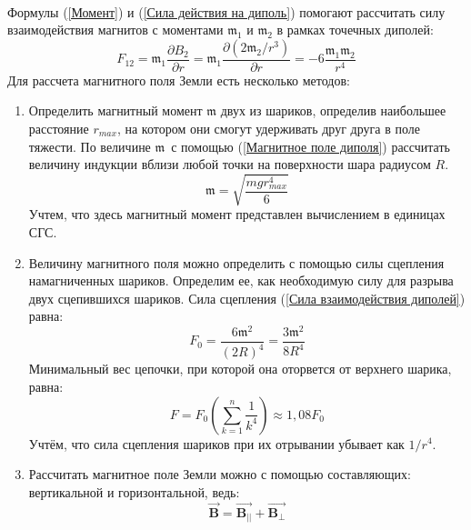 \documentclass[a4paper, 12pt]{article}
\begin{document}
\paragraph{}
Формулы (\ref{Момент}) и (\ref{Сила действия на диполь}) помогают рассчитать силу взаимодействия магнитов с моментами $\mathfrak{m_{1}}$ и $\mathfrak{m_{2}}$ в рамках точечных диполей:
\begin{equation}
    F_{12} = \mathfrak{m}_{1}{\frac{\partial {B_{2}}}{\partial r}} = \mathfrak{m}_{1}\frac{\partial (2\mathfrak{m}_{2}/r^{3})}{\partial r}  =-6\frac{\mathfrak{m}_{1}\mathfrak{m}_{2}}{r^{4}}
    \label{Сила взаимодействия диполей}
\end{equation}
Для рассчета магнитного поля Земли есть несколько методов:
\begin{enumerate}
    \item Определить магнитный момент $\mathfrak{m}$ двух из шариков, определив наибольшее расстояние $\mathit{r_{max}}$, на котором они смогут удерживать друг друга в поле тяжести. По величине $\mathfrak{m}$\
    с помощью (\ref{Магнитное поле диполя}) рассчитать величину индукции вблизи любой точки на поверхности шара радиусом $\mathit{R}$.
    \begin{equation}
        \mathfrak{m} = \sqrt{\frac{mgr_{max}^{4}}{6}}
        \label{Магнитный момент}
    \end{equation}
    Учтем, что здесь магнитный момент представлен вычислением в единицах СГС.
    \item Величину магнитного поля можно определить с помощью силы сцепления намагниченных шариков. Определим ее, как необходимую силу для разрыва двух сцепившихся шариков. Сила сцепления (\ref{Сила взаимодействия диполей}) равна:
    \begin{equation}
        F_{0} = \frac{6\mathfrak{m}^{2}}{(2R)^{4}} = \frac{3\mathfrak{m}^2}{8R^{4}}
        \label{Сила сцепления}
    \end{equation}
    Минимальный вес цепочки, при которой она оторвется от верхнего шарика, равна:
    \begin{equation}
        F = F_{0}\left(\sum_{k = 1}^n \frac{1}{k^{4}}\right) \approx 1,08F_{0}
        \label{Вес цепочки}
    \end{equation}
    Учтём, что сила сцепления шариков при их отрывании убывает как $1/r^{4}$.
    \item Рассчитать магнитное поле Земли можно с помощью составляющих: вертикальной и горизонтальной, ведь:
    \begin{equation}
        \vec{\mathbf{B}} = \vec{\mathbf{B_{||}}} + \vec{\mathbf{B_{\perp}}}

\end{equation}
\end{enumerate}
\end{document}
